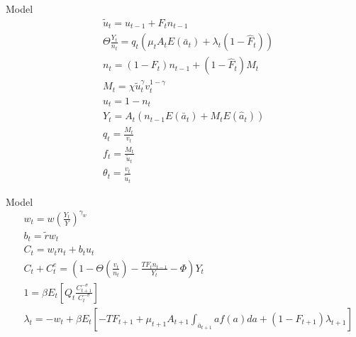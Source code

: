 \documentclass{beamer}
\begin{document}
\begin{frame}{Model}
    \begin{align}
     &\tilde{u}_t=u_{t-1}+F_tn_{t-1}\\
     &\Theta\frac{Y_t}{n_t}=q_t(\mu_tA_tE(\bar{a}_t)+\lambda_t(1-\hat{F}_t))\\
    &n_t=(1-F_t)n_{t-1}+(1-\hat{F}_t)M_{t}\\
    &M_t=\chi \tilde{u}_{t}^\gamma v_{t}^{1-\gamma}\\
    &u_t=1-n_t\\
    &Y_t=A_t(n_{t-1}E(\bar{a}_t)+M_tE(\hat{a}_t))\\
    &q_t= \frac{M_t}{v_t} \\
    &f_t=\frac{M_t}{\tilde{u}_{t}}\\
    &\theta_t=\frac{v_t}{\tilde{u}_t}
    \end{align}
\end{frame}
\begin{frame}{Model}
    \begin{align}
      &w_t=w(\frac{Y_t}{Y})^{\gamma_w}\\
    &b_t=\tilde{r}w_t\\
    &C_t=w_tn_t+b_tu_t\\
     &C_t+C_t^e=(1-\Theta(\frac{ v_t}{n_t})-\frac{TF_tn_{t-1}}{Y_t} -\Phi)Y_t\\
    &1= \beta E_t\left[Q_t\frac{C_{t+1}^{-\sigma}}{C_t^{-\sigma}}\right]\\
    & \lambda_t=-w_t+\beta E_t[-TF_{t+1}+\mu_{t+1}A_{t+1}\int_{\bar{a}_{t+1}}af(a)da+(1-F_{t+1})\lambda_{t+1}]
      \end{align}
\end{frame}
\end{document}

